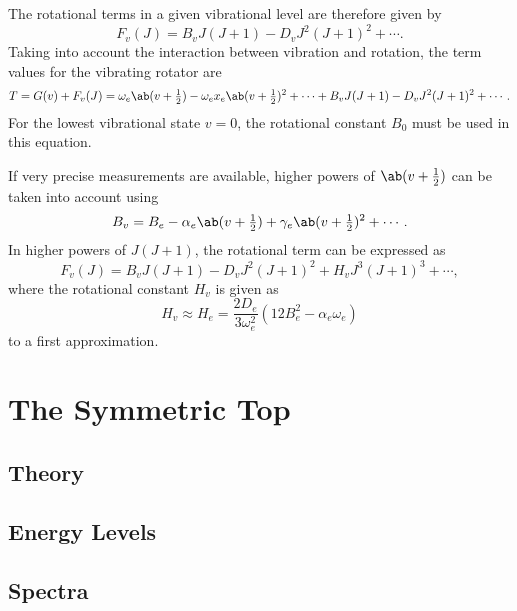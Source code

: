 The rotational terms in a given vibrational level are therefore given by
\begin{equation*}
    F_v(J) = B_vJ(J + 1) - D_vJ^2(J + 1)^2 + \dotsb.
\end{equation*}
Taking into account the interaction between vibration and rotation, the term values for the vibrating rotator are
\begin{equation*}
    T = G(v) + F_v(J) = \omega_e\ab(v + \tfrac{1}{2}) - \omega_ex_e\ab(v + \tfrac{1}{2})^2 + \dotsb + B_vJ(J + 1) - D_vJ^2(J + 1)^2 + \dotsb.
\end{equation*}
For the lowest vibrational state $v = 0$, the rotational constant $B_0$ must be used in this equation.

If very precise measurements are available, higher powers of $\ab(v + \tfrac{1}{2})$ can be taken into account using
\begin{equation*}
    B_v = B_e - \alpha_e\ab(v + \tfrac{1}{2}) + \gamma_e\ab(v + \tfrac{1}{2})^2 + \dotsb.
\end{equation*}
In higher powers of $J(J + 1)$, the rotational term can be expressed as
\begin{equation*}
    F_v(J) = B_vJ(J + 1) - D_vJ^2(J + 1)^2 + H_vJ^3(J + 1)^3 + \dotsb,
\end{equation*}
where the rotational constant $H_v$ is given as
\begin{equation*}
    H_v \approx H_e = \frac{2D_e}{3\omega_e^2}(12B_e^2 - \alpha_e\omega_e)
\end{equation*}
to a first approximation.

\section{The Symmetric Top}
\label{s:the_symmetric_top}

\subsection{Theory}

\subsection{Energy Levels}

\subsection{Spectra}
